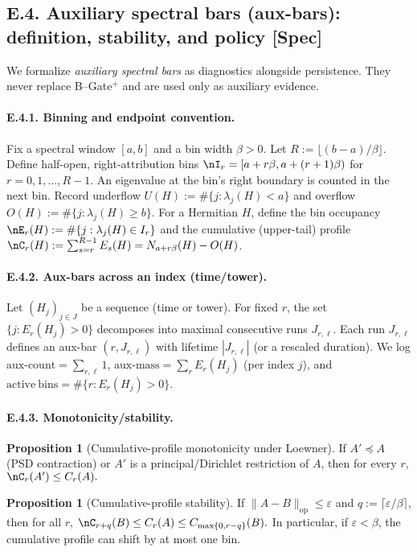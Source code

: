 \documentclass[11pt]{article}
\numberwithin{equation}{section}
\theoremstyle{plain}
\theoremstyle{definition}
\theoremstyle{remark}
\theoremstyle{plain}
\theoremstyle{definition}
\numberwithin{equation}{section}
\newtheorem{proposition}[theorem]{Proposition}
\theoremstyle{definition}
\numberwithin{equation}{section}
\theoremstyle{plain}
\theoremstyle{definition}
\theoremstyle{remark}
\providecommand{\n}{\unskip\space}
\begin{document}
\subsection*{E.4. Auxiliary spectral bars (aux-bars): definition, stability, and policy [Spec]}

We formalize \emph{auxiliary spectral bars} as diagnostics alongside persistence. They never replace B–Gate\(^{+}\) and are used only as auxiliary evidence.

\paragraph{E.4.1. Binning and endpoint convention.}
Fix a spectral window \([a,b]\) and a bin width \(\beta>0\).
Let \(R:=\lfloor (b-a)/\beta\rfloor\).
Define half-open, right-attribution bins
\(\nI_r=[a+r\beta,a+(r+1)\beta)\n\)
for \(r=0,1,\dots,R-1\).
An eigenvalue at the bin’s right boundary is counted in the next bin.
Record underflow \(U(H):=\#\{j:\lambda_j(H)<a\}\) and overflow \(O(H):=\#\{j:\lambda_j(H)\ge b\}\).
For a Hermitian \(H\), define the bin occupancy
\(\nE_r(H):=\#\{j:\lambda_j(H)\in I_r\}\n\)
and the cumulative (upper-tail) profile
\(\nC_r(H):=\sum_{s=r}^{R-1}E_s(H)=N_{a+r\beta}(H)-O(H)\).
 
\paragraph{E.4.2. Aux-bars across an index (time/tower).}
Let \((H_j)_{j\in J}\) be a sequence (time or tower).
For fixed \(r\), the set \(\{j:E_r(H_j)>0\}\) decomposes into maximal consecutive runs \(J_{r,\ell}\).
Each run \(J_{r,\ell}\) defines an aux-bar \((r,J_{r,\ell})\) with lifetime \(|J_{r,\ell}|\) (or a rescaled duration).
We log \(\mathrm{aux\text{-}count}=\sum_{r,\ell}1\), \(\mathrm{aux\text{-}mass}=\sum_r E_r(H_j)\) (per index \(j\)), and \(\mathrm{active\ bins}=\#\{r:E_r(H_j)>0\}\).

\paragraph{E.4.3. Monotonicity/stability.}
\begin{proposition}[Cumulative-profile monotonicity under Loewner]\label{E:prop:aux-cum-mono}
If \(A'\preceq A\) (PSD contraction) or \(A'\) is a principal/Dirichlet restriction of \(A\), then for every \(r\),
\(\nC_r(A')\le C_r(A).\n\)
\end{proposition}

\begin{proposition}[Cumulative-profile stability]\label{E:prop:aux-cum-stab}
If \(\|A-B\|_{\mathrm{op}}\le \varepsilon\) and \(q:=\lceil \varepsilon/\beta\rceil\), then for all \(r\),
\(\nC_{r+q}(B)\le C_r(A)\le C_{\max\{0,r-q\}}(B).\n\)
In particular, if \(\varepsilon<\beta\), the cumulative profile can shift by at most one bin.
\end{proposition}
\end{document}
